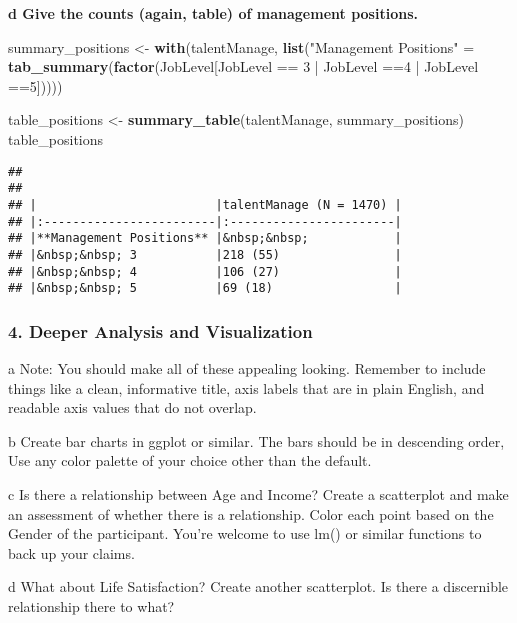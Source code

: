 \documentclass[]{article}
\newenvironment{Shaded}{\begin{snugshade}}{\end{snugshade}}
\newcommand{\KeywordTok}[1]{\textcolor[rgb]{0.13,0.29,0.53}{\textbf{{#1}}}}
\newcommand{\DecValTok}[1]{\textcolor[rgb]{0.00,0.00,0.81}{{#1}}}
\newcommand{\StringTok}[1]{\textcolor[rgb]{0.31,0.60,0.02}{{#1}}}
\newcommand{\NormalTok}[1]{{#1}}
\begin{document}
\textbf{d Give the counts (again, table) of management positions.}

\begin{Shaded}
\begin{Highlighting}[]
\NormalTok{summary_positions <-}\StringTok{ }\KeywordTok{with}\NormalTok{(talentManage,}
                     \KeywordTok{list}\NormalTok{(}\StringTok{"Management Positions"} \NormalTok{=}\StringTok{ }\KeywordTok{tab_summary}\NormalTok{(}\KeywordTok{factor}\NormalTok{(JobLevel[JobLevel ==}\StringTok{ }\DecValTok{3} \NormalTok{|}\StringTok{ }\NormalTok{JobLevel ==}\DecValTok{4} \NormalTok{|}\StringTok{ }\NormalTok{JobLevel ==}\DecValTok{5}\NormalTok{]))))}

\NormalTok{table_positions <-}\StringTok{ }\KeywordTok{summary_table}\NormalTok{(talentManage, summary_positions)}
\NormalTok{table_positions}
\end{Highlighting}
\end{Shaded}

\begin{verbatim}
## 
## 
## |                         |talentManage (N = 1470) |
## |:------------------------|:-----------------------|
## |**Management Positions** |&nbsp;&nbsp;            |
## |&nbsp;&nbsp; 3           |218 (55)                |
## |&nbsp;&nbsp; 4           |106 (27)                |
## |&nbsp;&nbsp; 5           |69 (18)                 |
\end{verbatim}

\subsubsection{4. Deeper Analysis and
Visualization}\label{deeper-analysis-and-visualization}

a Note: You should make all of these appealing looking. Remember to
include things like a clean, informative title, axis labels that are in
plain English, and readable axis values that do not overlap.

b Create bar charts in ggplot or similar. The bars should be in
descending order, Use any color palette of your choice other than the
default.

c Is there a relationship between Age and Income? Create a scatterplot
and make an assessment of whether there is a relationship. Color each
point based on the Gender of the participant. You're welcome to use lm()
or similar functions to back up your claims.

d What about Life Satisfaction? Create another scatterplot. Is there a
discernible relationship there to what?
\end{document}
